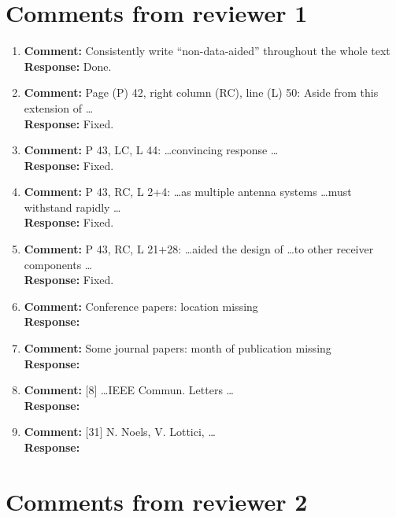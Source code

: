 \documentclass{article}
\begin{document}
\section{Comments from reviewer 1}

\begin{enumerate}

\item \textbf{Comment:} Consistently write ``non-data-aided'' throughout the whole text \\
\textbf{Response:} Done.

\item \textbf{Comment:} Page (P) 42, right column (RC), line (L) 50: Aside from this extension of \dots \\
\textbf{Response:} Fixed.


\item \textbf{Comment:} P 43, LC, L 44: \dots convincing response \dots \\
\textbf{Response:} Fixed.

\item \label{eq:rev1:multantenna} \textbf{Comment:} P 43, RC, L 2+4: \dots as multiple antenna systems \dots must withstand rapidly \dots \\
\textbf{Response:} Fixed.

\item \textbf{Comment:} P 43, RC, L 21+28: \dots aided the design of \dots to other receiver components \dots \\
\textbf{Response:} Fixed.

\item \textbf{Comment:} Conference papers: location missing \\
\textbf{Response:} 

\item \textbf{Comment:} Some journal papers: month of publication missing \\
\textbf{Response:}

\item \textbf{Comment:} [8] \dots IEEE Commun. Letters \dots \\
\textbf{Response:}

\item \textbf{Comment:} [31] N. Noels, V. Lottici, \dots \\
\textbf{Response:}

\end{enumerate}

\section{Comments from reviewer 2}
\end{document}

